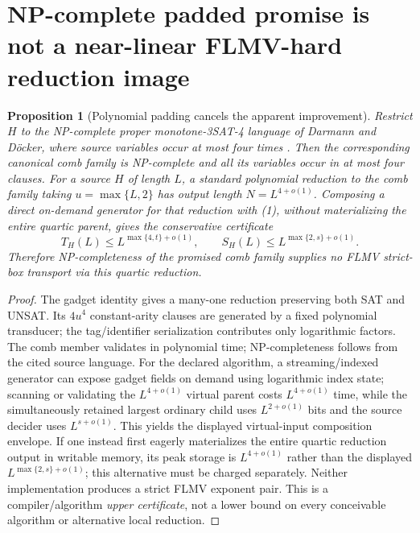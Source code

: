 \documentclass[11pt]{article}
\newtheorem{proposition}[theorem]{Proposition}
\begin{document}
\section{NP-complete padded promise is not a near-linear FLMV-hard reduction image}
\begin{proposition}[Polynomial padding cancels the apparent improvement]
Restrict $H$ to the NP-complete proper monotone-3SAT-4 language of Darmann and D\"ocker, where source variables occur at most four times \cite{docker}. Then the corresponding canonical comb family is NP-complete and all its variables occur in at most four clauses. For a source $H$ of length $L$, a standard polynomial reduction to the comb family taking $u=\max\{L,2\}$ has output length $N=L^{4+o(1)}$. Composing a direct on-demand generator for that reduction with (1), without materializing the entire quartic parent, gives the conservative certificate
\[
 T_H(L)\le L^{\max\{4,t\}+o(1)},\qquad
 S_H(L)\le L^{\max\{2,s\}+o(1)}.
\]
Therefore NP-completeness of the promised comb family supplies \emph{no FLMV strict-box transport} via this quartic reduction.
\end{proposition}
\begin{proof}
The gadget identity gives a many-one reduction preserving both SAT and UNSAT. Its $4u^4$ constant-arity clauses are generated by a fixed polynomial transducer; the tag/identifier serialization contributes only logarithmic factors. The comb member validates in polynomial time; NP-completeness follows from the cited source language. For the declared algorithm, a streaming/indexed generator can expose gadget fields on demand using logarithmic index state; scanning or validating the $L^{4+o(1)}$ virtual parent costs $L^{4+o(1)}$ time, while the simultaneously retained largest  ordinary child uses $L^{2+o(1)}$ bits and the source decider uses $L^{s+o(1)}$. This yields the displayed virtual-input composition envelope. If one instead first eagerly materializes the  entire quartic reduction output in writable memory, its peak storage is $L^{4+o(1)}$ rather than the displayed $L^{\max\{2,s\}+o(1)}$; this alternative must be charged separately. Neither implementation produces a strict FLMV exponent pair. This is a compiler/algorithm \emph{upper certificate}, not a lower bound on every conceivable algorithm or alternative local reduction.
\end{proof}
\end{document}
